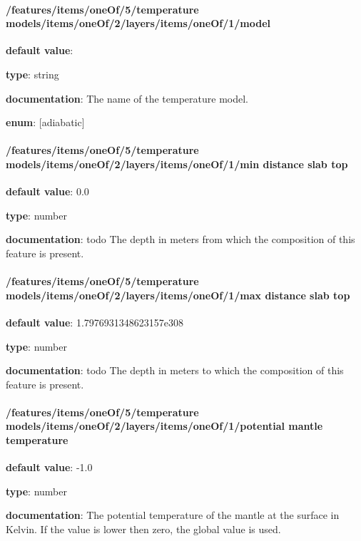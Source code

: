 \paragraph{/features/items/oneOf/5/temperature models/items/oneOf/2/layers/items/oneOf/1/model} \begin{itemized}
\item {\bf default value}: 
\item {\bf type}: string
\item {\bf documentation}: The name of the temperature model.
\item {\bf enum}: [adiabatic]\end{itemized}\paragraph{/features/items/oneOf/5/temperature models/items/oneOf/2/layers/items/oneOf/1/min distance slab top} \begin{itemized}
\item {\bf default value}: 0.0
\item {\bf type}: number
\item {\bf documentation}: todo The depth in meters from which the composition of this feature is present.
\end{itemized}\paragraph{/features/items/oneOf/5/temperature models/items/oneOf/2/layers/items/oneOf/1/max distance slab top} \begin{itemized}
\item {\bf default value}: 1.7976931348623157e308
\item {\bf type}: number
\item {\bf documentation}: todo The depth in meters to which the composition of this feature is present.
\end{itemized}\paragraph{/features/items/oneOf/5/temperature models/items/oneOf/2/layers/items/oneOf/1/potential mantle temperature} \begin{itemized}
\item {\bf default value}: -1.0
\item {\bf type}: number
\item {\bf documentation}: The potential temperature of the mantle at the surface in Kelvin. If the value is lower then zero, the global value is used.

\end{itemized}
